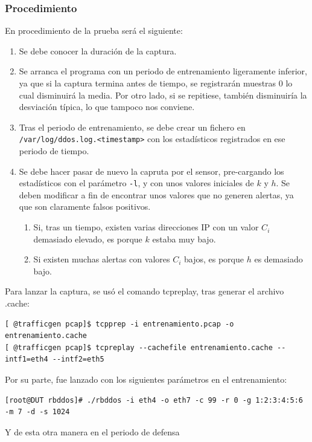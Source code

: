 \subsubsection{Procedimiento}
En procedimiento de la prueba será el siguiente:
\begin{enumerate}
 \item Se debe conocer la duración de la captura. 
 \item Se arranca el programa con un periodo de entrenamiento ligeramente inferior, ya que si la captura termina antes 
de tiempo, se registrarán muestras $0$ lo cual disminuirá la media. Por otro lado, si se repitiese, también disminuiría 
la desviación típica, lo que tampoco nos conviene.
 \item Tras el periodo de entrenamiento, se debe crear un fichero en \texttt{/var/log/ddos.log.<timestamp>} con los 
estadísticos registrados en ese periodo de tiempo.
 \item Se debe hacer pasar de nuevo la capruta por el sensor, pre-cargando los estadísticos con el parámetro 
\texttt{-l}, y con unos valores iniciales de $k$ y $h$. Se deben modificar a fin de encontrar unos valores que no 
generen alertas, ya que son claramente falsos positivos.
 \begin{enumerate}
  \item Si, tras un tiempo, existen varias direcciones \gls{IP} con un valor $C_i$ demasiado elevado, es porque $k$ 
estaba muy bajo.
  \item Si existen muchas alertas con valores $C_i$ bajos, es porque $h$ es demasiado bajo.
 \end{enumerate}
\end{enumerate}

Para lanzar la captura, se usó el comando tcpreplay, tras generar el archivo .cache:

\begin{verbatim}
[ @trafficgen pcap]$ tcpprep -i entrenamiento.pcap -o entrenamiento.cache
[ @trafficgen pcap]$ tcpreplay --cachefile entrenamiento.cache --intf1=eth4 --intf2=eth5
\end{verbatim}

Por su parte, \redborderddos fue lanzado con los siguientes parámetros en el entrenamiento:

\begin{verbatim}
[root@DUT rbddos]# ./rbddos -i eth4 -o eth7 -c 99 -r 0 -g 1:2:3:4:5:6  -m 7 -d -s 1024
\end{verbatim}

Y de esta otra manera en el periodo de defensa

